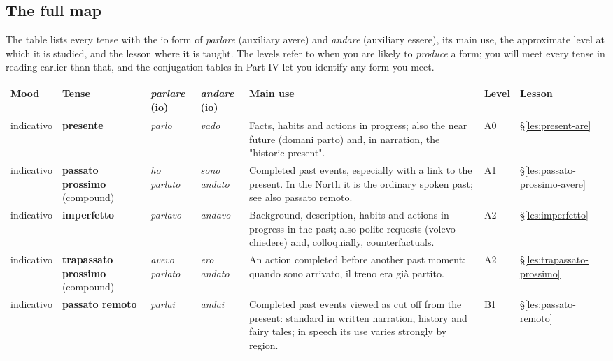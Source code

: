 \documentclass[11pt,a4paper,twoside,openright]{book}
\newcommand{\tablecaption}[1]{\par\smallskip\noindent{\sffamily\small\bfseries #1}\par\nopagebreak\vspace{1pt}}
\begin{document}
\subsection{The full map}\label{les:verb-system-overview:map}

The table lists every tense with the io form of \textit{parlare} (auxiliary avere) and \textit{andare} (auxiliary essere), its main use, the approximate level at which it is studied, and the lesson where it is taught. The levels refer to when you are likely to \textit{produce} a form; you will meet every tense in reading earlier than that, and the conjugation tables in Part IV let you identify any form you meet.\par

{\footnotesize\setlength{\LTpre}{2pt}
\tablecaption{The Italian verb system}
\begin{xltabular}{\linewidth}{@{}>{\raggedright\arraybackslash}p{1.6cm} >{\raggedright\arraybackslash}p{2.1cm} l l L l l@{}}
\toprule
\textbf{Mood} & \textbf{Tense} & \textbf{\textit{parlare}} (io) & \textbf{\textit{andare}} (io) & \textbf{Main use} & \textbf{Level} & \textbf{Lesson} \\
\midrule
\endhead
indicativo & \textbf{presente} & \textit{parlo} & \textit{vado} & Facts, habits and actions in progress; also the near future (domani parto) and, in narration, the "historic present". & A0 & \S\ref{les:present-are} \\
indicativo & \textbf{passato prossimo} {\color{muted}(compound)} & \textit{ho parlato} & \textit{sono andato} & Completed past events, especially with a link to the present. In the North it is the ordinary spoken past; see also passato remoto. & A1 & \S\ref{les:passato-prossimo-avere} \\
indicativo & \textbf{imperfetto} & \textit{parlavo} & \textit{andavo} & Background, description, habits and actions in progress in the past; also polite requests (volevo chiedere) and, colloquially, counterfactuals. & A2 & \S\ref{les:imperfetto} \\
indicativo & \textbf{trapassato prossimo} {\color{muted}(compound)} & \textit{avevo parlato} & \textit{ero andato} & An action completed before another past moment: quando sono arrivato, il treno era già partito. & A2 & \S\ref{les:trapassato-prossimo} \\
indicativo & \textbf{passato remoto} & \textit{parlai} & \textit{andai} & Completed past events viewed as cut off from the present: standard in written narration, history and fairy tales; in speech its use varies strongly by region. & B1 & \S\ref{les:passato-remoto} \\

\end{xltabular}}
\end{document}
